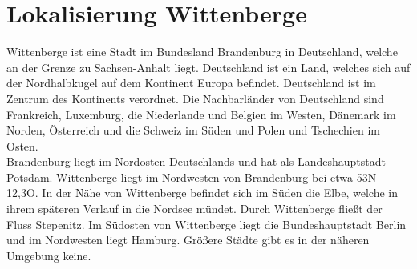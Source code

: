 \documentclass[12pt,a4paper]{report}
\begin{document}
	\section{Lokalisierung Wittenberge}	Wittenberge ist eine Stadt im Bundesland Brandenburg in Deutschland, welche an der Grenze zu Sachsen-Anhalt liegt.
	Deutschland ist ein Land, welches sich auf der Nordhalbkugel auf dem Kontinent Europa befindet.
	Deutschland ist im Zentrum des Kontinents verordnet.
	Die Nachbarländer von Deutschland sind Frankreich, Luxemburg, die Niederlande und Belgien im Westen, Dänemark im Norden, Österreich und die Schweiz im Süden und Polen und Tschechien im Osten.
	\\
	Brandenburg liegt im Nordosten Deutschlands und hat als Landeshauptstadt Potsdam.
	Wittenberge liegt im Nordwesten von Brandenburg bei etwa 53\degree N 12,3\degree O.
	In der Nähe von Wittenberge befindet sich im Süden die Elbe, welche in ihrem späteren Verlauf in die Nordsee mündet.
	Durch Wittenberge fließt der Fluss Stepenitz.
	Im Südosten von Wittenberge liegt die Bundeshauptstadt Berlin und im Nordwesten liegt Hamburg.
	Größere Städte gibt es in der näheren Umgebung keine.
\end{document}
